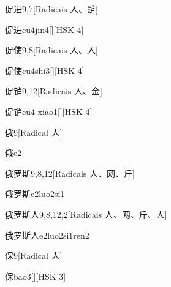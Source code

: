 \begin{entry}{促进}{9,7}[Radicais ⼈、⾡]
  \begin{phonetics}{促进}{cu4jin4}[][HSK 4]
  \end{phonetics}
\end{entry}

\begin{entry}{促使}{9,8}[Radicais ⼈、⼈]
  \begin{phonetics}{促使}{cu4shi3}[][HSK 4]
  \end{phonetics}
\end{entry}

\begin{entry}{促销}{9,12}[Radicais ⼈、⾦]
  \begin{phonetics}{促销}{cu4 xiao1}[][HSK 4]
  \end{phonetics}
\end{entry}

\begin{entry}{俄}{9}[Radical ⼈]
  \begin{phonetics}{俄}{e2}
  \end{phonetics}
\end{entry}

\begin{entry}{俄罗斯}{9,8,12}[Radicais ⼈、⽹、⽄]
  \begin{phonetics}{俄罗斯}{e2luo2si1}
  \end{phonetics}
\end{entry}

\begin{entry}{俄罗斯人}{9,8,12,2}[Radicais ⼈、⽹、⽄、⼈]
  \begin{phonetics}{俄罗斯人}{e2luo2si1ren2}
  \end{phonetics}
\end{entry}

\begin{entry}{保}{9}[Radical ⼈]
  \begin{phonetics}{保}{bao3}[][HSK 3]
  \end{phonetics}
\end{entry}

